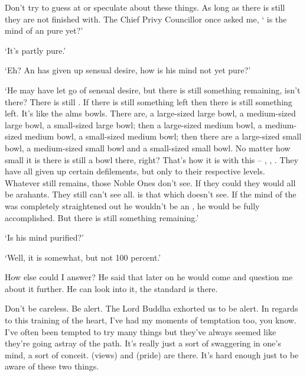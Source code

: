 Don't try to guess at or speculate about these things. As long as there is still  they are not finished with. The Chief Privy Councillor once asked me, ` is the mind of an  pure yet?' 

`It's partly pure.' 

`Eh? An  has given up sensual desire, how is his mind not yet pure?' 

`He may have let go of sensual desire, but there is still something remaining, isn't there? There is still . If there is still something left then there is still something left. It's like the  alms bowls. There are, a large-sized large bowl, a medium-sized large bowl, a small-sized large bowl; then a large-sized medium bowl, a medium-sized medium bowl, a small-sized medium bowl; then there are a large-sized small bowl, a medium-sized small bowl and a small-sized small bowl. No matter how small it is there is still a bowl there, right? That's how it is with this -- , , . They have all given up certain defilements, but only to their respective levels. Whatever still remains, those Noble Ones don't see. If they could they would all be arahants. They still can't see all.  is that which doesn't see. If the mind of the  was completely straightened out he wouldn't be an , he would be fully accomplished. But there is still something remaining.'

`Is his mind purified?' 

`Well, it is somewhat, but not 100 percent.' 

How else could I answer? He said that later on he would come and question me about it further. He can look into it, the standard is there. 

Don't be careless. Be alert. The Lord Buddha exhorted us to be alert. In regards to this training of the heart, I've had my moments of temptation too, you know. I've often been tempted to try many things but they've always seemed like they're going astray of the path. It's really just a sort of swaggering in one's mind, a sort of conceit.  (views) and  (pride) are there. It's hard enough just to be aware of these two things. 

